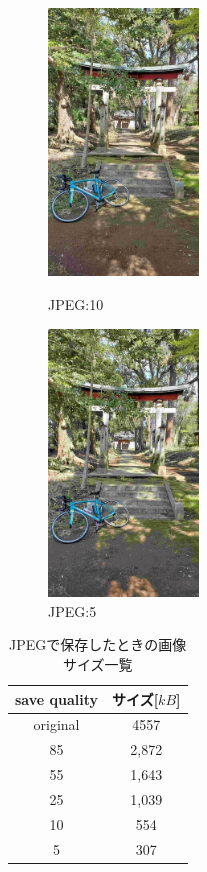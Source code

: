 \documentclass[a4paper,11pt]{bxjsarticle}
\begin{document}
  \begin{figure}[htbp]
    \begin{minipage}{0.5\hsize}
     \begin{center}
      \includegraphics[width=40mm]{sample_j10.jpg}
     \end{center}
     \caption{JPEG:10}
     \label{fig:j10}
    \end{minipage}
    \begin{minipage}{0.5\hsize}
     \begin{center}
      \includegraphics[width=40mm]{sample_j5.jpg}
     \end{center}
     \caption{JPEG:5}
     \label{fig:j5}
    \end{minipage}
   \end{figure}


   \begin{table}[htbp]
    \begin{center}
      \caption{JPEGで保存したときの画像サイズ一覧}
      \begin{tabular}{|c|c|} \hline
        save quality & サイズ[$kB$] \\\hline
        original & 4557  \\
        85 & 2,872  \\ 
        55 & 1,643  \\
        25 & 1,039 \\
        10 & 554 \\
        5 & 307 \\\hline

      \end{tabular}
      \label{tab:result_jpeg_filesize}
    \end{center}
  \end{table}
\newpage
\end{document}
